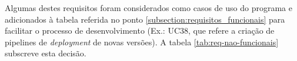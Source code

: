 Algumas destes requisitos foram considerados como casos de uso do programa e adicionados à tabela referida no ponto \ref{subsection:requisitos_funcionais} para facilitar o processo de desenvolvimento (Ex.: UC38, que refere a criação de pipelines de \textit{deployment} de novas versões). A tabela \ref{tab:req-nao-funcionais} subscreve esta decisão.







